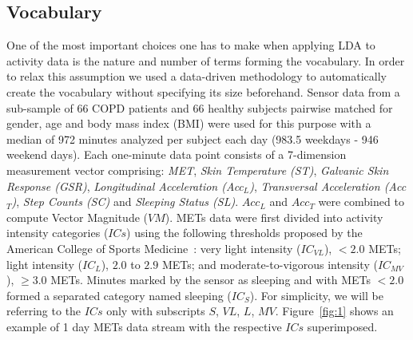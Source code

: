 \subsection{Vocabulary}
One of the most important choices one has to make when applying LDA to activity data is the nature and number of terms forming the vocabulary. In order to relax this assumption we used a data-driven methodology to automatically create the vocabulary without specifying its size beforehand. Sensor data from a sub-sample of 66 COPD patients and 66 healthy subjects pairwise matched for gender, age and body mass index (BMI) were used for this purpose
with a median of 972 minutes analyzed per subject each day (983.5 weekdays - 946 weekend days).
Each one-minute data point consists of a 7-dimension measurement vector comprising: \emph{MET}, \emph{Skin Temperature (ST)}, \emph{Galvanic Skin Response (GSR)}, \emph{Longitudinal Acceleration (Acc$_{L}$)}, \emph{Transversal Acceleration (Acc$_{T}$)}, \emph{Step Counts (SC)} and \emph{Sleeping Status (SL)}. $Acc_{L}$ and $Acc_{T}$ were combined to compute Vector Magnitude ($VM$). METs data were first divided into activity intensity categories ($ICs$) using the following thresholds proposed by the American College of Sports Medicine~\cite{Garber_2011}: very light intensity ($IC_{VL}$), $<2.0$ METs; light intensity ($IC_{L}$), $2.0$ to $2.9$ METs; and moderate-to-vigorous intensity ($IC_{MV}$), $\geq3.0$ METs.
Minutes marked by the sensor as sleeping and with METs $<2.0$ formed a separated category named sleeping ($IC_{S}$). For simplicity, we will be referring to the $ICs$ only with subscripts $S$, $VL$, $L$, $MV$. Figure~\ref{fig:1} shows an example of 1 day METs data stream with the respective $ICs$ superimposed.\\
